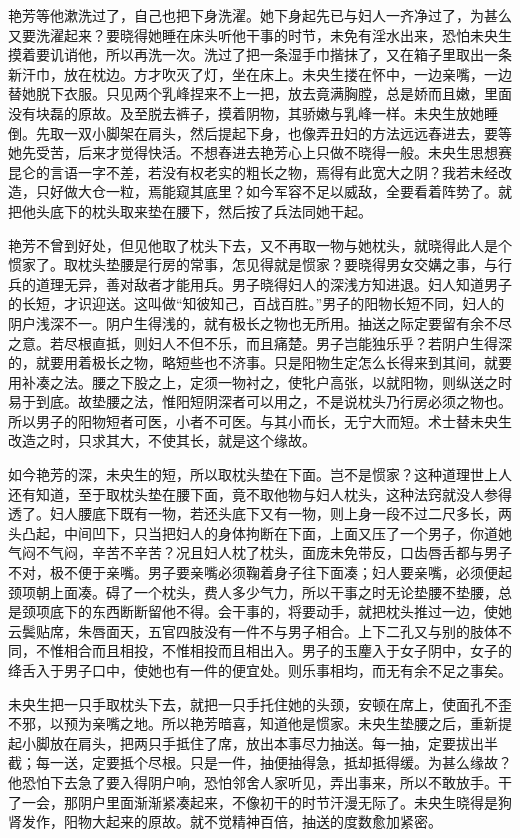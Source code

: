 \documentclass[a4paper,12pt,UTF8,twoside]{ctexbook}
\begin{document}
艳芳等他漱洗过了，自己也把下身洗濯。她下身起先已与妇人一齐净过了，为甚么又要洗濯起来？要晓得她睡在床头听他干事的时节，未免有淫水出来，恐怕未央生摸着要讥诮他，所以再洗一次。洗过了把一条湿手巾揩抹了，又在箱子里取出一条新汗巾，放在枕边。方才吹灭了灯，坐在床上。未央生搂在怀中，一边亲嘴，一边替她脱下衣服。只见两个乳峰捏来不上一把，放去竟满胸膛，总是娇而且嫩，里面没有块磊的原故。及至脱去裤子，摸着阴物，其骄嫩与乳峰一样。未央生放她睡倒。先取一双小脚架在肩头，然后提起下身，也像弄丑妇的方法远远舂进去，要等她先受苦，后来才觉得快活。不想舂进去艳芳心上只做不晓得一般。未央生思想赛昆仑的言语一字不差，若没有权老实的粗长之物，焉得有此宽大之阴？我若未经改造，只好做大仓一粒，焉能窥其底里？如今军容不足以威敌，全要看着阵势了。就把他头底下的枕头取来垫在腰下，然后按了兵法同她干起。

艳芳不曾到好处，但见他取了枕头下去，又不再取一物与她枕头，就晓得此人是个惯家了。取枕头垫腰是行房的常事，怎见得就是惯家？要晓得男女交媾之事，与行兵的道理无异，善对敌者才能用兵。男子晓得妇人的深浅方知进退。妇人知道男子的长短，才识迎送。这叫做“知彼知己，百战百胜。”男子的阳物长短不同，妇人的阴户浅深不一。阴户生得浅的，就有极长之物也无所用。抽送之际定要留有余不尽之意。若尽根直抵，则妇人不但不乐，而且痛楚。男子岂能独乐乎？若阴户生得深的，就要用着极长之物，略短些也不济事。只是阳物生定怎么长得来到其间，就要用补凑之法。腰之下股之上，定须一物衬之，使牝户高张，以就阳物，则纵送之时易于到底。故垫腰之法，惟阳短阴深者可以用之，不是说枕头乃行房必须之物也。所以男子的阳物短者可医，小者不可医。与其小而长，无宁大而短。术士替未央生改造之时，只求其大，不使其长，就是这个缘故。

如今艳芳的深，未央生的短，所以取枕头垫在下面。岂不是惯家？这种道理世上人还有知道，至于取枕头垫在腰下面，竟不取他物与妇人枕头，这种法窍就没人参得透了。妇人腰底下既有一物，若还头底下又有一物，则上身一段不过二尺多长，两头凸起，中间凹下，只当把妇人的身体拘断在下面，上面又压了一个男子，你道她气闷不气闷，辛苦不辛苦？况且妇人枕了枕头，面庞未免带反，口齿唇舌都与男子不对，极不便于亲嘴。男子要亲嘴必须鞠着身子往下面凑；妇人要亲嘴，必须便起颈项朝上面凑。碍了一个枕头，费人多少气力，所以干事之时无论垫腰不垫腰，总是颈项底下的东西断断留他不得。会干事的，将要动手，就把枕头推过一边，使她云鬓贴席，朱唇面天，五官四肢没有一件不与男子相合。上下二孔又与别的肢体不同，不惟相合而且相投，不惟相投而且相出入。男子的玉麈入于女子阴中，女子的绛舌入于男子口中，使她也有一件的便宜处。则乐事相均，而无有余不足之事矣。

未央生把一只手取枕头下去，就把一只手托住她的头颈，安顿在席上，使面孔不歪不邪，以预为亲嘴之地。所以艳芳暗喜，知道他是惯家。未央生垫腰之后，重新提起小脚放在肩头，把两只手抵住了席，放出本事尽力抽送。每一抽，定要拔出半截；每一送，定要抵个尽根。只是一件，抽便抽得急，抵却抵得缓。为甚么缘故？他恐怕下去急了要入得阴户响，恐怕邻舍人家听见，弄出事来，所以不敢放手。干了一会，那阴户里面渐渐紧凑起来，不像初干的时节汗漫无际了。未央生晓得是狗肾发作，阳物大起来的原故。就不觉精神百倍，抽送的度数愈加紧密。
\end{document}
